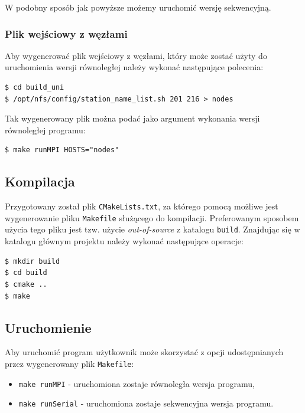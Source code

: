 \documentclass[12pt]{article}
\begin{document}
\noindent
W podobny sposób jak powyższe możemy uruchomić wersję sekwencyjną.

\subsubsection{Plik wejściowy z węzłami}

Aby wygenerować plik wejściowy z węzłami, który może zostać użyty do uruchomienia wersji równoległej należy wykonać następujące polecenia:
\begin{lstlisting}
$ cd build_uni
$ /opt/nfs/config/station_name_list.sh 201 216 > nodes
\end{lstlisting}

\noindent
Tak wygenerowany plik można podać jako argument wykonania wersji równoległej programu:
\begin{lstlisting}
$ make runMPI HOSTS="nodes"
\end{lstlisting}


\subsection{Kompilacja}
 Przygotowany został plik \lstinline|CMakeLists.txt|, za którego pomocą możliwe jest wygenerowanie pliku \lstinline{Makefile} służącego do kompilacji. Preferowanym sposobem użycia tego pliku jest tzw. użycie \textit{out-of-source} z katalogu \lstinline{build}. Znajdując się w katalogu głównym projektu należy wykonać następujące operacje:
\begin{lstlisting}
$ mkdir build
$ cd build
$ cmake ..
$ make
\end{lstlisting}

\subsection{Uruchomienie} \label{sec:uru}

Aby uruchomić program użytkownik może skorzystać z opcji udostępnianych przez wygenerowany plik \lstinline|Makefile|:
\begin{itemize}
\item  \lstinline|make runMPI| - uruchomiona zostaje równoległa wersja programu,
\item  \lstinline|make runSerial| - uruchomiona zostaje sekwencyjna wersja programu.
\end{itemize}
\end{document}
